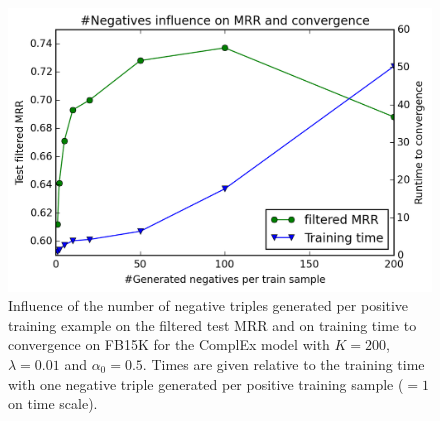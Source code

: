 \documentclass{article}
\newcommand{\rank}{K} %
\newcommand{\Seb}[1]{\todo[inline,backgroundcolor=white!20!white]{Seb: #1}}
\begin{document}
\begin{figure}[h]
	\centering
	\includegraphics[width=0.99\linewidth]{neg_ratio_plot.png}
	
    \caption{Influence of the number of negative triples generated per positive training example on the filtered test MRR and on training time to convergence on FB15K for the ComplEx model with $\rank=200$, $\lambda=0.01$ and $\alpha_0=0.5$. Times are given relative to the training time with one negative triple generated per positive training sample ($=1$ on time scale).}
	\label{fig:neg_ratio}
	
\end{figure}






\end{document}
